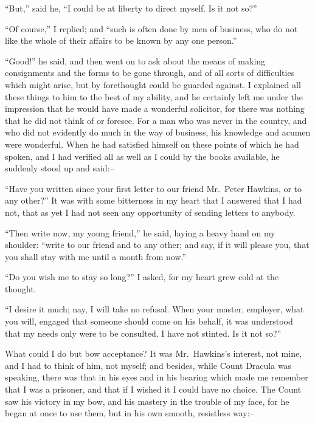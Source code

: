 \documentclass[12pt,openright]{book}
\begin{document}
“But,” said he, “I could be at liberty to direct myself. Is it not so?”

“Of course,” I replied; and “such is often done by men of business, who do not like the whole of their affairs to be known by any one person.”

“Good!” he said, and then went on to ask about the means of making consignments and the forms to be gone through, and of all sorts of difficulties which might arise, but by forethought could be guarded against. I explained all these things to him to the best of my ability, and he certainly left me under the impression that he would have made a wonderful solicitor, for there was nothing that he did not think of or foresee. For a man who was never in the country, and who did not evidently do much in the way of business, his knowledge and acumen were wonderful. When he had satisfied himself on these points of which he had spoken, and I had verified all as well as I could by the books available, he suddenly stood up and said:–

“Have you written since your first letter to our friend Mr. Peter Hawkins, or to any other?” It was with some bitterness in my heart that I answered that I had not, that as yet I had not seen any opportunity of sending letters to anybody.

“Then write now, my young friend,” he said, laying a heavy hand on my shoulder: “write to our friend and to any other; and say, if it will please you, that you shall stay with me until a month from now.”

“Do you wish me to stay so long?” I asked, for my heart grew cold at the thought.

“I desire it much; nay, I will take no refusal. When your master, employer, what you will, engaged that someone should come on his behalf, it was understood that my needs only were to be consulted. I have not stinted. Is it not so?”

What could I do but bow acceptance? It was Mr. Hawkins’s interest, not mine, and I had to think of him, not myself; and besides, while Count Dracula was speaking, there was that in his eyes and in his bearing which made me remember that I was a prisoner, and that if I wished it I could have no choice. The Count saw his victory in my bow, and his mastery in the trouble of my face, for he began at once to use them, but in his own smooth, resistless way:–
\end{document}
